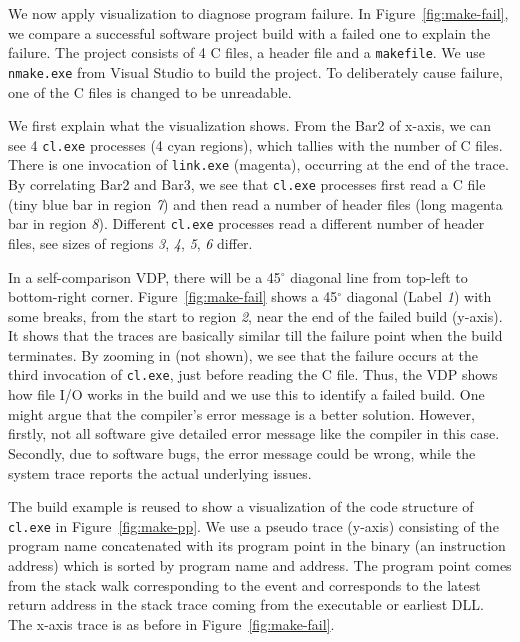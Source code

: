 We now apply visualization to diagnose program failure.
In Figure~\ref{fig:make-fail}, we compare a successful software project build
with a failed one to explain the failure.
The project consists of 4 C files, a header file and a {\tt makefile}.
We use {\tt nmake.exe} from Visual Studio to build the project.
To deliberately cause failure, one of the C files is changed
to be unreadable.

We first explain what the visualization shows.
From the Bar2 of x-axis, 
we can see 4 {\tt cl.exe} processes (4 cyan regions), which tallies
with the number of C files.
There is one invocation of {\tt link.exe} (magenta),
occurring at the end of the trace.
By correlating Bar2 and Bar3, we see that
{\tt cl.exe} processes first read a C file (tiny blue bar in region {\em 7})
and then read a number of header files (long magenta bar in region {\em 8}).
Different {\tt cl.exe} processes read a different number of header files,
see sizes of regions {\em 3}, {\em 4}, {\em 5}, {\em 6} differ.

In a self-comparison VDP, there will be a 45$^\circ$
diagonal line from top-left to bottom-right corner.
Figure~\ref{fig:make-fail} shows a 45$^\circ$ diagonal (Label {\em 1})
with some breaks, from
the start to region {\em 2}, near the end of the failed build (y-axis).
It shows that the traces are basically similar till the failure point
when the build terminates.
By zooming in (not shown),
we see that the failure occurs at the third invocation of
{\tt cl.exe}, just before reading the C file.
Thus, the VDP shows how file I/O works in the build and we use this
to identify a failed build.
One might argue that the compiler's error message is a better solution.
However, firstly,
not all software give detailed error message like the compiler in this case.
Secondly, due to software bugs, the error message could be wrong, while 
the system trace reports the actual underlying issues.

The build example is reused to show a visualization of the code structure
of {\tt cl.exe} in Figure~\ref{fig:make-pp}.
We use a pseudo trace (y-axis) consisting of the program name
concatenated with its program point in the binary (an instruction address)
which is sorted by program name and address.
The program point comes from the stack walk corresponding to the event
and corresponds to the latest return address in the stack trace
coming from the executable or earliest DLL.
The x-axis trace is as before in Figure~\ref{fig:make-fail}.

